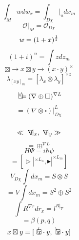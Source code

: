 \documentclass{jsarticle}
\begin{document}
\title{}
\author{}
\date{}
\maketitle

   \newcommand{\variint}{%
	\begin{picture}(15,30)
		\put(0,0){
			$ \iint $}
		\put(0,5){\line(15,0){15}}
	\end{picture} %
}

\newcommand{\variiint}{%
	\begin{picture}(15,15)
		\put(0,0){
			$ \iiint $}
		\put(0,5){\line(15,0){20}}
	\end{picture} %
}



 \newcommand{\alearletter}{%
	 \begin{picture}(10,20)
		 \put(0,0){
			 $ \square $}
		 \put(0,0){\line(1,1){10}}
	 \end{picture} %
	 }

\newcommand{\letter}{%
	\begin{picture}(5,5)
		\put(0,0){
			$ \square $}
		\put(3,3){$\vee$}
	\end{picture} %
}
 \newcommand{\secproduct}{%
	 \begin{picture}(10,20)
		 \put(0,0){
			 $ \nabla $}
		 \put(5,0){+}
	 \end{picture} %
	 }
 \newcommand{\average}{%
	 \begin{picture}(5,5)
		 \put(0,0){
			 $ \square $}
		 \put(3,3){$\slash$}
	 \end{picture} %
	 }
\newcommand{\averagesqrt}{%
	 \begin{picture}(5,5)
		 \put(0,0){
			 $ \square $}
		 \put(3,3){$\setminus $}
	 \end{picture} %
	 }





  $$\int_M w dw_x = \int_{D\chi}|_u dx_m $$
  $$ \mathcal{O}|_M = \mathcal{O}_{D\chi} $$
  $$ w = (1 + x)^{1 \over 2} $$
  $$ (1 + i)^n = \int z dz_m $$
  $$ \boxtimes \to x \boxtimes y \to (x \cdot y)^{\times} $$
  $$ \lambda_{[xy]_m} = [\lambda_x \otimes \lambda_y]^{\times z} $$

  $$ \letter = (\nabla \oplus \square)^{\nabla L} $$
  $$ = (\nabla \otimes \square)|^{L}_{D\chi} $$
  $$ \ll \secproduct|_x, \secproduct|_y \gg $$
  $$ = \boxplus^{\nabla L} $$
  $$ H\Psi = i \hbar \psi $$
  $$ = [\vartriangleright|^{\times L_n}, 
  \blacktriangleright|^{\times L_m}] $$
  $$ V_{D\chi}\int dx_m = S \otimes S $$
  $$ = V\int dx_m = S^2 \oplus S^2 $$
  $$ \int R^{\nabla r}dr_x = l^{R|_{\nabla}} $$
  $$ = \beta(p,q) $$
  $$ x \boxtimes y = [\average x\cdot y, \averagesqrt x \cdot y] $$ 
\end{document}

